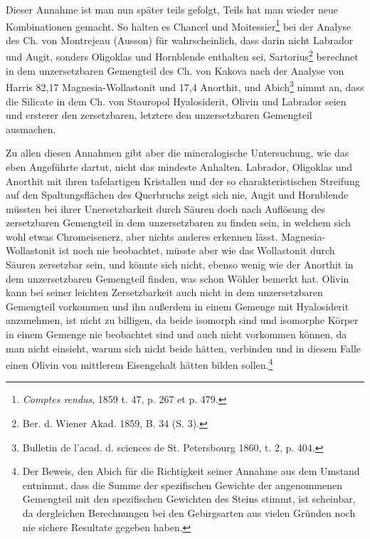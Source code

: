 \documentclass[a4paper, 11pt, oneside]{article}
\begin{document}
Dieser Annahme ist man nun später teils gefolgt, Teils hat man wieder neue Kombinationen gemacht. So halten es Chancel und Moitessier\footnote{\emph{Comptes rendus}, 1859 t. 47, p. 267 et p. 479.} bei der Analyse des Ch. von Montrejeau (Ausson) für wahrscheinlich, dass darin nicht Labrador und Augit, sonders Oligoklas und Hornblende enthalten sei, Sartorius\footnote{Ber. d. Wiener Akad. 1859, B. 34 (S. 3).} berechnet in dem unzersetzbaren Gemengteil des Ch. von Kakova nach der Analyse von Harris 82,17 Magnesia-Wollastonit und 17,4 Anorthit, und Abich\footnote{Bulletin de l'acad. d. sciences de St. Petersbourg 1860, t. 2, p. 404.} nimmt an, dass die Silicate in dem Ch. von Stauropol Hyalosiderit, Olivin und Labrador seien und ersterer den zersetzbaren, letztere den unzersetzbaren Gemengteil ausmachen.

Zu allen diesen Annahmen gibt aber die mineralogische Untersuchung, wie das eben Angeführte dartut, nicht das mindeste Anhalten. Labrador, Oligoklas und Anorthit mit ihren tafelartigen Kristallen und der so charakteristischen Streifung auf den Spaltungsflächen des Querbruchs zeigt sich nie, Augit und Hornblende müssten bei ihrer Unersetzbarkeit durch Säuren doch nach Auflösung des zersetzbaren Gemengteil in dem unzersetzbaren zu finden sein, in welchem sich wohl etwas Chromeisenerz, aber nichts anderes erkennen lässt. Magnesia- Wollastonit ist noch nie beobachtet, müsste aber wie das Wollastonit durch Säuren zersetzbar sein, und könnte sich nicht, ebenso wenig wie der Anorthit in dem unzersetzbaren Gemengteil finden, was schon Wöhler bemerkt hat. Olivin kann bei seiner leichten Zersetzbarkeit auch nicht in dem unzersetzbaren Gemengteil vorkommen und ihn außerdem in einem Gemenge mit Hyalosiderit anzunehmen, ist nicht zu billigen, da beide isomorph sind und isomorphe Körper in einem Gemenge nie beobachtet sind und auch nicht vorkommen können, da man nicht einsieht, warum sich nicht beide hätten, verbinden und in diesem Falle einen Olivin von mittlerem Eisengehalt hätten bilden sollen.\footnote{Der Beweis, den Abich für die Richtigkeit seiner Annahme aus dem Umstand entnimmt, dass die Summe der spezifischen Gewichte der angenommenen Gemengteil mit den spezifischen Gewichten des Steins stimmt, ist scheinbar, da dergleichen Berechnungen bei den Gebirgsarten aus vielen Gründen noch nie sichere Resultate gegeben haben.}
\end{document}
